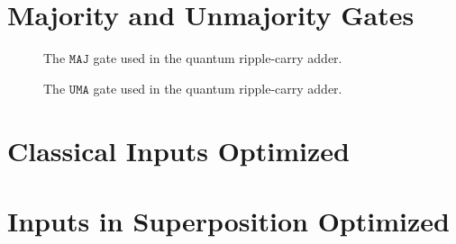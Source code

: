 \begin{appendices}
\section{Majority and Unmajority Gates}
\label{appendix:majGates}
\begin{figure}[htp]
    \centering     
    \begin{minipage}{.45\textwidth}
        
        \caption{The $\texttt{MAJ}$ gate used in the quantum ripple-carry adder.}
        \label{fig:eval_majorityGate}
    \end{minipage}
    \hfill
    \begin{minipage}{.45\textwidth}
        
        \caption{The $\texttt{UMA}$ gate used in the quantum ripple-carry adder.}    
        \label{fig:eval_unmajorityGate}
    \end{minipage}
\end{figure}

\section{Classical Inputs Optimized}
\label{appendix:classicalInputs_optimized}


\section{Inputs in Superposition Optimized}
\label{appendix:superposInputs_optimized}






\end{appendices}